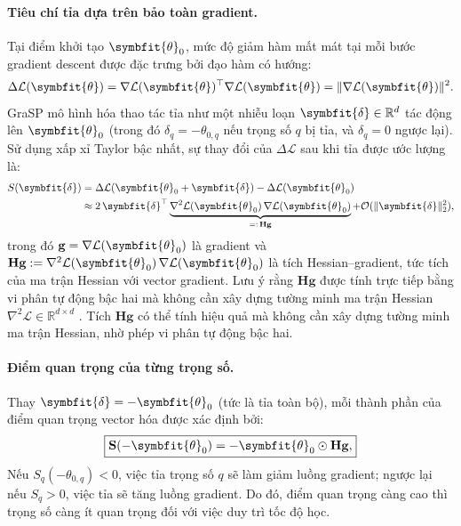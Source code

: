 \paragraph{\textbf{Tiêu chí tỉa dựa trên bảo toàn gradient.}\cite{grasp}}
Tại điểm khởi tạo $\symbfit{\theta}_0$, mức độ giảm hàm mất mát tại mỗi bước
gradient descent được đặc trưng bởi đạo hàm có hướng:
\begin{equation}
    \Delta\mathcal{L}(\symbfit{\theta})
    = \nabla\mathcal{L}(\symbfit{\theta})^\top \nabla\mathcal{L}(\symbfit{\theta})
    = \|\nabla\mathcal{L}(\symbfit{\theta})\|^2.
    \label{eq:gradient_flow}
\end{equation}
GraSP mô hình hóa thao tác tỉa như một nhiễu loạn
$\symbfit{\delta} \in \mathbb{R}^d$ tác động lên $\symbfit{\theta}_0$
(trong đó $\delta_q = -\theta_{0,q}$ nếu trọng số $q$ bị tỉa, và
$\delta_q = 0$ ngược lại).
Sử dụng xấp xỉ Taylor bậc nhất, sự thay đổi của $\Delta\mathcal{L}$
sau khi tỉa được ước lượng là:
\begin{align}
    S(\symbfit{\delta})
     & = \Delta\mathcal{L}(\symbfit{\theta}_0 + \symbfit{\delta})
    - \Delta\mathcal{L}(\symbfit{\theta}_0) \notag                \\
     & \approx 2\,\symbfit{\delta}^\top
    \underbrace{\nabla^2\mathcal{L}(\symbfit{\theta}_0)
        \,\nabla\mathcal{L}(\symbfit{\theta}_0)}_{=:\,\mathbf{Hg}}
    + \mathcal{O}(\|\symbfit{\delta}\|_2^2),
    \label{eq:taylor_approx}
\end{align}
trong đó $\mathbf{g} = \nabla \mathcal{L}(\symbfit{\theta}_0)$ là gradient và
$\mathbf{H}\mathbf{g} := \nabla^2 \mathcal{L}(\symbfit{\theta}_0)\,\nabla \mathcal{L}(\symbfit{\theta}_0)$
là tích Hessian--gradient, tức tích của ma trận Hessian với vector gradient.
Lưu ý rằng $\mathbf{Hg}$ được tính trực tiếp bằng vi phân tự động bậc hai
mà không cần xây dựng tường minh ma trận Hessian $\nabla^2\mathcal{L} \in \mathbb{R}^{d\times d}$
.
Tích $\mathbf{Hg}$ có thể tính hiệu quả mà không cần xây dựng tường minh
ma trận Hessian, nhờ phép vi phân tự động bậc hai.

\paragraph{\textbf{Điểm quan trọng của từng trọng số.}\cite{grasp}}
Thay $\symbfit{\delta} = -\symbfit{\theta}_0$ (tức là tỉa toàn bộ), mỗi thành phần
của điểm quan trọng vector hóa được xác định bởi:
\begin{equation}
    \boxed{
        \mathbf{S}(-\symbfit{\theta}_0)
        = -\symbfit{\theta}_0 \odot \mathbf{Hg},
    }
    \label{eq:grasp_score}
\end{equation}
Nếu $S_q(-\theta_{0,q}) < 0$, việc tỉa trọng số $q$ sẽ làm giảm
luồng gradient; ngược lại nếu $S_q > 0$, việc tỉa sẽ tăng
luồng gradient.
Do đó, điểm quan trọng càng cao thì trọng số càng ít quan trọng
đối với việc duy trì tốc độ học.

